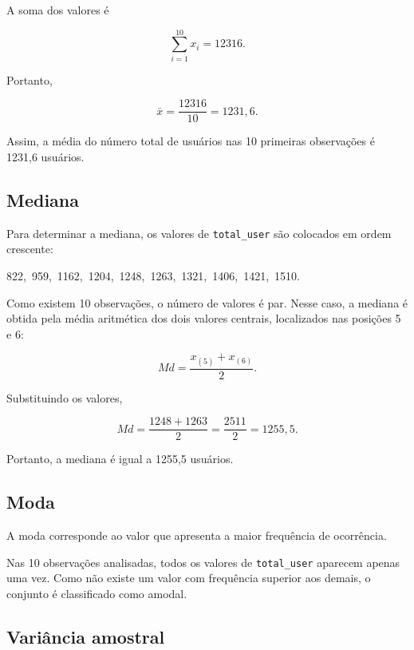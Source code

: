 \documentclass[12pt,a4paper]{article}
\begin{document}
A soma dos valores é

\begin{equation}
\sum_{i=1}^{10}x_i = 12316.
\end{equation}

Portanto,

\begin{equation}
\bar{x} =
\frac{12316}{10}
=
1231{,}6.
\end{equation}

Assim, a média do número total de usuários nas 10 primeiras observações é
1231,6 usuários.

\subsection{Mediana}

Para determinar a mediana, os valores de \texttt{total\_user} são colocados em
ordem crescente:

\begin{center}
822,\ 959,\ 1162,\ 1204,\ 1248,\ 1263,\ 1321,\ 1406,\ 1421,\ 1510.
\end{center}

Como existem 10 observações, o número de valores é par. Nesse caso, a mediana é
obtida pela média aritmética dos dois valores centrais, localizados nas posições
5 e 6:

\begin{equation}
Md =
\frac{x_{(5)} + x_{(6)}}{2}.
\end{equation}

Substituindo os valores,

\begin{equation}
Md =
\frac{1248 + 1263}{2}
=
\frac{2511}{2}
=
1255{,}5.
\end{equation}

Portanto, a mediana é igual a 1255,5 usuários.

\subsection{Moda}

A moda corresponde ao valor que apresenta a maior frequência de ocorrência.

Nas 10 observações analisadas, todos os valores de \texttt{total\_user}
aparecem apenas uma vez. Como não existe um valor com frequência superior aos
demais, o conjunto é classificado como amodal.

\subsection{Variância amostral}
\end{document}
